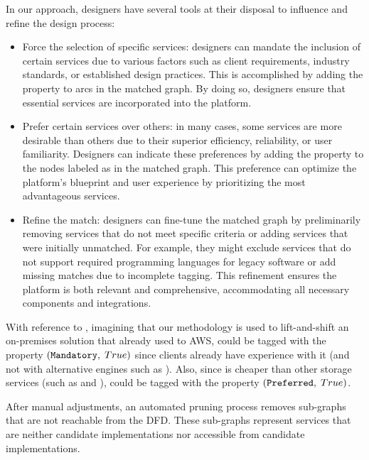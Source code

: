 In our approach, designers have several tools at their disposal to influence and refine the design process:
\begin{itemize}
    \item Force the selection of specific services: designers can mandate the inclusion of certain services due to various factors such as client requirements, industry standards, or established design practices. This is accomplished by adding the property  to  arcs in the matched graph. By doing so, designers ensure that essential services are incorporated into the platform.
    \item Prefer certain services over others: in many cases, some services are more desirable than others due to their superior efficiency, reliability, or user familiarity. Designers can indicate these preferences by adding the property  to the nodes labeled as  in the matched graph. This preference can optimize the platform's blueprint and user experience by prioritizing the most advantageous services.
    \item Refine the match: designers can fine-tune the matched graph by preliminarily removing services that do not meet specific criteria or adding services that were initially unmatched. For example, they might exclude services that do not support required programming languages for legacy software or add missing matches due to incomplete tagging. This refinement ensures the platform is both relevant and comprehensive, accommodating all necessary components and integrations.
\end{itemize}

\begin{example}
With reference to , imagining that our methodology is used to lift-and-shift an on-premises solution that already used  to AWS,  could be tagged with the property $(\texttt{Mandatory},\;True)$ since clients already have experience with it (and not with alternative engines such as ). Also, since  is cheaper than other storage services (such as  and ),  could be tagged with the property $(\texttt{Preferred},\;True)$.
\end{example}

After manual adjustments, an automated pruning process removes sub-graphs that are not reachable from the DFD. These sub-graphs represent services that are neither candidate implementations nor accessible from candidate implementations.

